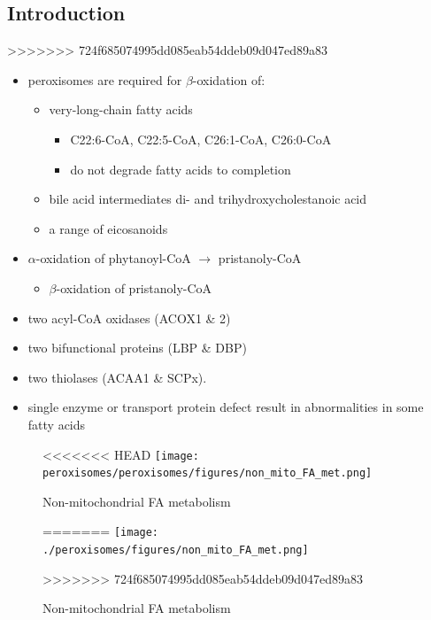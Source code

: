 \documentclass[fontsize=12pt]{scrartcl}
\begin{document}
\begin{enumerate}
\begin{enumerate}
\begin{enumerate}
\begin{enumerate}
\begin{table}[htbp]
\begin{enumerate}
\begin{enumerate}
\begin{enumerate}
\begin{enumerate}
\begin{enumerate}
\begin{enumerate}
\begin{enumerate}
\subsection{Introduction}
\label{sec:org0b6fad1}
>>>>>>> 724f685074995dd085eab54ddeb09d047ed89a83
\begin{itemize}
\item peroxisomes are required for \(\beta\)-oxidation of:
\begin{itemize}
\item very-long-chain fatty acids
\begin{itemize}
\item C22:6-CoA, C22:5-CoA, C26:1-CoA, C26:0-CoA
\item do not degrade fatty acids to completion
\end{itemize}
\item bile acid intermediates di- and trihydroxycholestanoic acid
\item a range of eicosanoids
\end{itemize}
\item \(\alpha\)-oxidation of phytanoyl-CoA \(\to\) pristanoly-CoA
\begin{itemize}
\item \(\beta\)-oxidation of pristanoly-CoA
\end{itemize}

\item two acyl-CoA oxidases (ACOX1 \& 2)
\item two bifunctional proteins (LBP \& DBP)
\item two thiolases (ACAA1 \& SCPx).
\item single enzyme or transport protein defect result in abnormalities in some fatty acids
\end{itemize}

\begin{figure}[htbp]
\centering
<<<<<<< HEAD
\texttt{[image: peroxisomes/peroxisomes/figures/non\_mito\_FA\_met.png]}
\caption[Non-mitochondrial FA metabolism]{\label{fig:org89a2752}Non-mitochondrial FA metabolism}
=======
\texttt{[image: ./peroxisomes/figures/non\_mito\_FA\_met.png]}
\caption[Non-mitochondrial FA metabolism]{\label{fig:org512c95a}
Non-mitochondrial FA metabolism}
>>>>>>> 724f685074995dd085eab54ddeb09d047ed89a83
\end{figure}


\end{enumerate}
\end{enumerate}
\end{enumerate}
\end{enumerate}
\end{enumerate}
\end{enumerate}
\end{enumerate}
\end{table}
\end{enumerate}
\end{enumerate}
\end{enumerate}
\end{enumerate}
\end{document}
